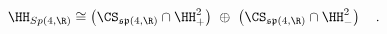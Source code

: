\begin{equation}
\HH_{Sp(4,\R )} \cong \left(\CS_{\mathfrak{sp}(4,\R )} \cap \HH^2_+
\right) \,\, \oplus \,\,
\left( \CS_{\mathfrak{sp}(4,\R )} \cap \HH^2_- \right) \quad .
\label{eq:hypdecomp}
\end{equation}

